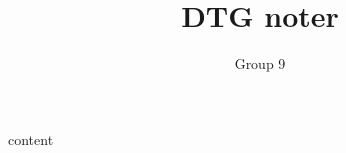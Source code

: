 \documentclass[11pt]{article}
\title{DTG noter}
\author{Group 9}
\begin{document}
    \maketitle

    \tableofcontents


    {content}
\end{document}

